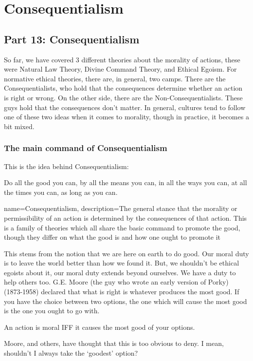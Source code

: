 \part{Consequentialism}
\label{ch.mod5}
\chapter{Part 13: Consequentialism}
So far, we have covered 3 different theories about the morality of actions, these were Natural Law Theory, Divine Command Theory, and Ethical Egoism. For normative ethical theories, there are, in general, two camps. There are the Consequentialists, who hold that the consequences determine whether an action is right or wrong. On the other side, there are the Non-Consequentialists. These guys hold that the consequences don’t matter. In general, cultures tend to follow one of these two ideas when it comes to morality, though in practice, it becomes a bit mixed.

\section{The main command of Consequentialism}

This is the idea behind \gls{Consequentialism}:
\begin{center}
Do all the good you can, by all the means you can, in all the ways you can, at all the times you can, as long as you can.
\end{center}

{
  name=Consequentialism,
  description={The general stance that the morality or permissibility of an action is determined by the consequences of that action. This is a family of theories which all share the basic command to promote the good, though they differ on what the good is and how one ought to promote it}
}

This stems from the notion that we are here on earth to do good. Our moral duty is to leave the world better than how we found it. But, we shouldn’t be ethical egoists about it, our moral duty extends beyond ourselves. We have a duty to help others too. G.E. Moore (the guy who wrote an early version of Porky) (1873-1958) declared that what is right is whatever produces the most good. If you have the choice between two options, the one which will cause the most good is the one you ought to go with.
\begin{center}
An action is moral IFF it causes the most good of your options.
\end{center}
Moore, and others, have thought that this is too obvious to deny. I mean, shouldn’t I always take the ‘goodest’ option? 


